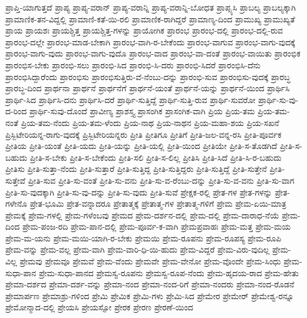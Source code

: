 {ಪ್ರಾಪ್ತಿ-ಯಾಗುತ್ತದೆ
ಪ್ರಾಪ್ಯ
ಪ್ರಾಪ್ಯ-ವರಾನ್
ಪ್ರಾಪ್ಯ-ವರಾನ್ನಿ
ಪ್ರಾಪ್ಯ-ವರಾನ್ನಿ-ಬೋಧತ
ಪ್ರಾಪ್ಸ್ಯಸಿ
ಪ್ರಾಬಲ್ಯ
ಪ್ರಾಬಲ್ಯಕ್ಕಾಗಿ
ಪ್ರಾಮಾಣಿಕ-ತನ-ವಿದ್ದಲ್ಲಿ
ಪ್ರಾಮಾಣಿ-ಕತೆ-ಯಿ-ರಲಿ
ಪ್ರಾಮಾಣಿಕ-ರಾಗಿದ್ದರೆ
ಪ್ರಾಮಾಣ್ಯ-ದಿಂದ
ಪ್ರಾಮುಖ್ಯ
ಪ್ರಾಮುಖ್ಯತೆ
ಪ್ರಾಯ
ಪ್ರಾಯಶಃ
ಪ್ರಾಯಶ್ಚಿತ್ತ
ಪ್ರಾಯಶ್ಚಿತ್ತ-ಗಳನ್ನು
ಪ್ರಾಯೋಗಿಕ
ಪ್ರಾರಂಭ
ಪ್ರಾರಂಭ-ದಲ್ಲಿ
ಪ್ರಾರಂಭ-ದಲ್ಲಿ-ರುವ
ಪ್ರಾರಂಭ-ದಲ್ಲೇ
ಪ್ರಾರಂಭ-ಮಾಡ-ಬೇಕಾಗಿ
ಪ್ರಾರಂಭ-ವಾಗಿ-ರ-ಬೇಕೆಂದು
ಪ್ರಾರಂಭ-ವಾಗುವ
ಪ್ರಾರಂಭ-ವಾಗು-ವುದಕ್ಕೆ
ಪ್ರಾರಂಭ-ವಾಗು-ವುದು
ಪ್ರಾರಂಭ-ವಾಗು-ವುದೊ
ಪ್ರಾರಂಭ-ವಾದ
ಪ್ರಾರಂಭ-ವಾ-ದಂತೆ
ಪ್ರಾರಂಭ-ವಾಯಿತು
ಪ್ರಾರಂಭಿಕ
ಪ್ರಾರಂಭಿಸ-ಬೇಕು
ಪ್ರಾರಂಭಿ-ಸಲು
ಪ್ರಾರಂಭಿ-ಸಿದ
ಪ್ರಾರಂಭಿ-ಸಿ-ದರು
ಪ್ರಾರಂಭಿ-ಸಿದರೆ
ಪ್ರಾರಂಭಿಸಿ-ದೆನು
ಪ್ರಾರಂಭಿಸಿದ್ದಾರೆಂದು
ಪ್ರಾರಂಭಿಸು
ಪ್ರಾರಂಭಿಸುತ್ತಿರು-ವೆ-ನೆಂಬು-ದನ್ನು
ಪ್ರಾರಂಭಿ-ಸುವ
ಪ್ರಾರಂಭಿಸು-ವುದಕ್ಕೆ
ಪ್ರಾರಬ್ಧ
ಪ್ರಾರಬ್ಧ-ದಿಂದ
ಪ್ರಾರ್ಥನಾ
ಪ್ರಾರ್ಥನೆ
ಪ್ರಾರ್ಥನೆಗೆ
ಪ್ರಾರ್ಥನೆ-ಯಂತೆ
ಪ್ರಾರ್ಥನೆ-ಯನ್ನು
ಪ್ರಾರ್ಥನೆ-ಯಿಂದ
ಪ್ರಾರ್ಥಿಸಿ
ಪ್ರಾರ್ಥಿ-ಸಿದ
ಪ್ರಾರ್ಥಿಸಿ-ದನು
ಪ್ರಾರ್ಥಿಸಿ-ದರೆ
ಪ್ರಾರ್ಥಿ-ಸುತ್ತಿದ್ದೆ
ಪ್ರಾರ್ಥಿ-ಸುತ್ತಿ-ರುವ
ಪ್ರಾರ್ಥಿ-ಸುವರೋ
ಪ್ರಾರ್ಥಿ-ಸು-ವು-ದ-ರಿಂದ
ಪ್ರಾರ್ಥಿ-ಸುವು-ದೊಂದೆ
ಪ್ರಾವೀಣ್ಯ
ಪ್ರಾಶಸ್ತ್ಯ
ಪ್ರಾಸಂಗಿಕ
ಪ್ರಾಸಂಗಿಕ-ವಾಗಿ
ಪ್ರಿಯ
ಪ್ರಿಯ-ತಮ
ಪ್ರಿಯ-ತಮ-ನಂತೆ
ಪ್ರಿಯ-ತಮ-ನೆಂದು
ಪ್ರಿಯ-ತಮ-ಳೆಂದು
ಪ್ರಿಯ-ನಾಥ
ಪ್ರಿಯ-ನಾಥನ
ಪ್ರಿಯ-ಮಹಾ-ಶಯ
ಪ್ರಿಯ-ಸಖನೆ
ಪ್ರಿಸ್ಬಿಟೇರಿಯನ್ನ-ರಾಗು-ವುದಕ್ಕೆ
ಪ್ರಿಸ್ಬಿಟೇರಿಯನ್ನರು
ಪ್ರೀತಿ
ಪ್ರೀತಿಗೂ
ಪ್ರೀತಿಗೆ
ಪ್ರೀತಿ-ಜಲ-ವನ್ನ-ರಸಿ
ಪ್ರೀತಿ-ಪೂರ್ವಕ
ಪ್ರೀತಿಯ
ಪ್ರೀತಿ-ಯಂತೆ
ಪ್ರೀತಿ-ಯದು
ಪ್ರೀತಿ-ಯನ್ನು
ಪ್ರೀತಿ-ಯಲ್ಲಿ
ಪ್ರೀತಿ-ಯಿಂದ
ಪ್ರೀತಿಯೇ
ಪ್ರೀತಿ-ಸ-ತೊಡಗಿದೆ
ಪ್ರೀತಿ-ಸ-ಬಹುದು
ಪ್ರೀತಿ-ಸ-ಬೇಕು
ಪ್ರೀತಿ-ಸ-ಬೇಕೆಂದು
ಪ್ರೀತಿ-ಸಲಿ
ಪ್ರೀತಿ-ಸ-ಲಿಲ್ಲ
ಪ್ರೀತಿಸಿ
ಪ್ರೀತಿ-ಸಿದೆ
ಪ್ರೀತಿ-ಸಿ-ರ-ಬಹುದು
ಪ್ರೀತಿಸು
ಪ್ರೀತಿ-ಸುತ್ತಾ-ನೆಂದು
ಪ್ರೀತಿ-ಸುತ್ತಾರೆ
ಪ್ರೀತಿ-ಸುತ್ತಿದ್ದ
ಪ್ರೀತಿ-ಸುತ್ತಿದ್ದರು
ಪ್ರೀತಿ-ಸುತ್ತಿದ್ದೆ
ಪ್ರೀತಿ-ಸುತ್ತೇನೆ
ಪ್ರೀತಿ-ಸುತ್ತೇವೆ
ಪ್ರೀತಿ-ಸುವ
ಪ್ರೀತಿ-ಸು-ವಂತೆ
ಪ್ರೀತಿ-ಸು-ವನು
ಪ್ರೀತಿ-ಸು-ವ-ರೆಂಬು-ದನ್ನು
ಪ್ರೀತಿ-ಸು-ವ-ವನು
ಪ್ರೀತಿ-ಸು-ವಾಗ
ಪ್ರೀತಿ-ಸು-ವುದಕ್ಕಾಗಿ
ಪ್ರೀತಿ-ಸು-ವು-ದನ್ನು
ಪ್ರೀತಿ-ಸು-ವುದು
ಪ್ರೀತಿ-ಸುವೆ
ಪ್ರೇಕ್ಷಕ-ರಲ್ಲಿ
ಪ್ರೇತ-ಗಳ
ಪ್ರೇತ-ಗಳನ್ನು
ಪ್ರೇತ-ಗಳೇನೊ
ಪ್ರೇತ-ಭೂಮಿ
ಪ್ರೇತ-ವನ್ನಾದರೂ
ಪ್ರೇತಾತ್ಮಕ್ಕೆ
ಪ್ರೇತಾತ್ಮ-ಗಳ
ಪ್ರೇತಾತ್ಮ-ಗಳಿಗೆ
ಪ್ರೇಮ
ಪ್ರೇಮ-ಏಯಿ-ಮಾತ್ರ
ಪ್ರೇಮಕ್ಕೆ
ಪ್ರೇಮ-ಗಳಲ್ಲಿ
ಪ್ರೇಮ-ಗಳೆಂಬವು
ಪ್ರೇಮದ
ಪ್ರೇಮ-ದರ್ಶನ-ದಲ್ಲಿ
ಪ್ರೇಮ-ದಲ್ಲಿ
ಪ್ರೇಮ-ದಾರಾಧ-ನೆಯೆ
ಪ್ರೇಮ-ದಿಂದ
ಪ್ರೇಮ-ಪಂಜ-ರದಿ
ಪ್ರೇಮ-ಪಾನ-ದಲ್ಲಿ
ಪ್ರೇಮ-ಪೂರ್ವ-ಕ-ವಾಗಿ
ಪ್ರೇಮಪ್ರವಾಹಃ
ಪ್ರೇಮ-ಮತ್ತ
ಪ್ರೇಮ-ಮಯ
ಪ್ರೇಮ-ಮ-ಯನು
ಪ್ರೇಮ-ಮಯಿ-ಯಾಗಿ-ರ-ಬೇಕು
ಪ್ರೇಮಯಿ
ಪ್ರೇಮ-ರೂಪನು
ಪ್ರೇಮ-ರೂಪಸ್ಯ
ಪ್ರೇಮ-ರೂಪಿ
ಪ್ರೇಮ-ವನ್ನು
ಪ್ರೇಮ-ವಲ್ಲ
ಪ್ರೇಮ-ವಾಗಿ
ಪ್ರೇಮ-ವಾರಿ-ಧಿ-ಯಿ-ಹುದು
ಪ್ರೇಮ-ವಿದ್ದರೆ
ಪ್ರೇಮ-ವಿರು-ವುದಿಲ್ಲ
ಪ್ರೇಮ-ವಿಲ್ಲ
ಪ್ರೇಮವು
ಪ್ರೇಮವೂ
ಪ್ರೇಮವೆ
ಪ್ರೇಮ-ವೆಂದು
ಪ್ರೇಮವೇ
ಪ್ರೇಮ-ವೇನೋ
ಪ್ರೇಮ-ವೊಂದೇ
ಪ್ರೇಮ-ಸಿಂಧು
ಪ್ರೇಮ-ಸುಧಾ-ಪಾನ
ಪ್ರೇಮ-ಸುಧಾ-ಪಾನದ
ಪ್ರೇಮಸ್ವ-ರೂಪನು
ಪ್ರೇಮಸ್ವ-ರೂಪ-ನೆಂದು
ಪ್ರೇಮ-ಹೃದಯ-ರಾದ
ಪ್ರೇಮ-ಹೇತು
ಪ್ರೇಮಾ-ದರ್ಶದ
ಪ್ರೇಮಾ-ದರ್ಶ-ವನ್ನು
ಪ್ರೇಮಾ-ನಂದ
ಪ್ರೇಮಾ-ನಂದ-ರಿಗೆ
ಪ್ರೇಮಾ-ನಂದರು
ಪ್ರೇಮಾ-ನಂದ-ರೊಡನೆ
ಪ್ರೇಮಾರ್ಪಣ
ಪ್ರೇಮಾಶ್ರು-ಗಳಿಂದ
ಪ್ರೇಮಿ
ಪ್ರೇಮಿಕ
ಪ್ರೇಮಿ-ಗಳು
ಪ್ರೇಮಿ-ಸಿದ
ಪ್ರೇಮೇರ
ಪ್ರೇಮೇರ್
ಪ್ರೇಮೇಶ್ವ-ರನ್ನೂ
ಪ್ರೇಮೋನ್ಮಾದ-ದಲ್ಲಿ
ಪ್ರೇಯಸಿ
ಪ್ರೇಯಸ್ಸೋ
ಪ್ರೇರಕ
ಪ್ರೇರಣ
ಪ್ರೇರಣೆ-ಯಿಂದ
}

